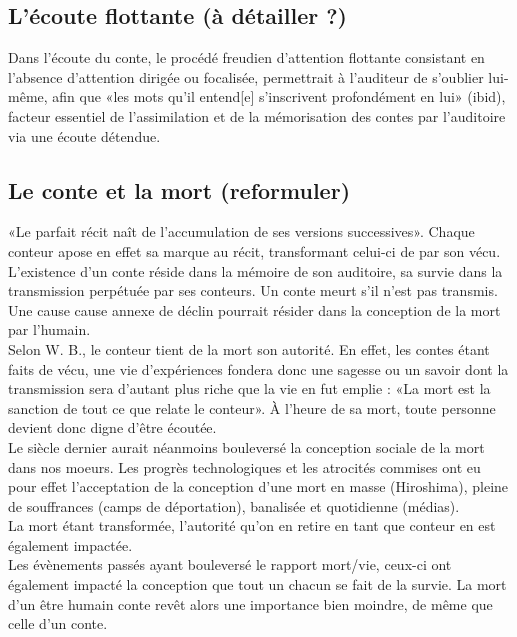 \documentclass[a4paper,12pt,final,oneside]{article}
\begin{document}
\subsection{L'écoute flottante (à détailler ?)}
Dans l'écoute du conte, le procédé freudien d'attention flottante consistant en l'absence d'attention dirigée ou focalisée, permettrait à l'auditeur de s'oublier lui-même, afin que «les mots qu'il entend[e] s'inscrivent profondément en lui» (ibid), facteur essentiel de l'assimilation et de la mémorisation des contes par l'auditoire via une écoute détendue.\\

\subsection{Le conte et la mort (reformuler)}
«Le parfait récit naît de l'accumulation de ses versions successives». Chaque conteur apose en effet sa marque au récit, transformant celui-ci de par son vécu.\\
L'existence d'un conte réside dans la mémoire de son auditoire, sa survie dans la transmission perpétuée par ses conteurs. Un conte meurt s'il n'est pas transmis.\\
Une cause cause annexe de déclin pourrait résider dans la conception de la mort par l'humain.\\
Selon W. B., le conteur tient de la mort son autorité. En effet, les contes étant faits de vécu, une vie d'expériences fondera donc une sagesse ou un savoir dont la transmission sera d'autant plus riche que la vie en fut emplie :  «La mort est la sanction de tout ce que relate le conteur». À l'heure de sa mort, toute personne devient donc digne d'être écoutée.\\

Le siècle dernier aurait néanmoins bouleversé la conception sociale de la mort dans nos moeurs. Les progrès technologiques et les atrocités commises ont eu pour effet l'acceptation de la conception d'une mort en masse (Hiroshima), pleine de souffrances (camps de déportation), banalisée et quotidienne (médias).\\
La mort étant transformée, l'autorité qu'on en retire en tant que conteur en est également impactée.\\
Les évènements passés ayant bouleversé le rapport mort/vie, ceux-ci ont également impacté la conception que tout un chacun se fait de la survie. La mort d'un être humain conte revêt alors une importance bien moindre, de même que celle d'un conte.
\clearpage
\end{document}
